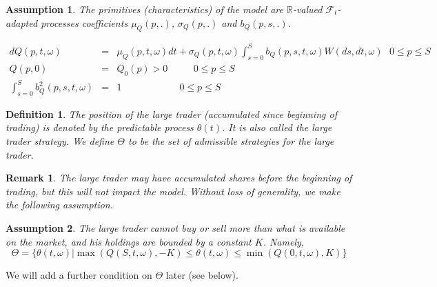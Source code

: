 \documentclass{article}
\newtheorem{definition}{Definition}
\newtheorem{remark}{Remark}
\newtheorem{assumption}{Assumption}
\begin{document}

\begin{assumption} \label{ass::primtive_Q_para}
The primitives (characteristics) of the model are $\mathbb{R}$-valued $%
\mathcal{F}_{t}$-adapted processes coefficients $\mu _{Q}(p,.)$, $\sigma
_{Q}(p,.)$ and $b_{Q}(p,s,.)$.

\begin{eqnarray}
dQ(p,t,\omega ) &=&\mu _{Q}(p,t,\omega )dt+\sigma _{Q}(p,t,\omega
)\int_{s=0}^{S}b_{Q}(p,s,t,\omega )W(ds,dt,\omega )\text{ \ \ \ }0\leq p\leq
S  \label{GenMod1} \\
Q(p,0) &=&Q_{0}(p)>0 \qquad\text{\ } 0\leq p\leq S  \label{GenMod2} \\
\int_{s=0}^{S}b_{Q}^{2}(p,s,t,\omega ) &=&1 \qquad\qquad\qquad 0\leq
p\leq S  \label{GenMod3}
\end{eqnarray}
\end{assumption}



\begin{definition}
The position of the large trader (accumulated since beginning of trading) is
denoted by the predictable process $\theta (t)$. It is also called the
\textit{large trader strategy}. We define $\Theta $ to be the set of
admissible strategies for the large trader.
\end{definition}



\begin{remark}
The large trader may have accumulated shares before the beginning of
trading, but this will not impact the model. Without loss of generality, we
make the following assumption.
\end{remark}



\begin{assumption}
The large trader cannot buy or sell more than what is available on the
market, and his holdings are bounded by a constant $K$. Namely,%
\begin{equation*}
\Theta =\{\theta (t,\omega )|\max (Q(S,t,\omega ),-K)\leq \theta (t,\omega
)\leq \min (Q(0,t,\omega ),K)\}
\end{equation*}
\end{assumption}

We will add a further condition on $\Theta $ later (see below).
\end{document}
